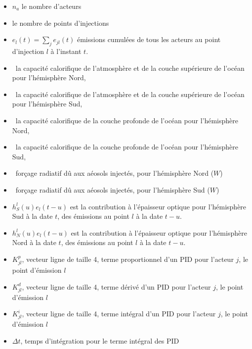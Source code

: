 \documentclass[a4paper,12pt]{article}
\begin{document}
\begin{itemize}
  \item $n_a$ le nombre d'acteurs
  \item \nlat le nombre de points d'injections
  \item $e_{l}(t)=\sum_{j} e_{jl}(t)$ émissions cumulées de tous les acteurs au point d'injection $l$ à l'instant $t$.
  \item \cn \ la capacité calorifique de l'atmosphère et de la couche supérieure de l'océan pour l'hémisphère Nord,
  \item \cs \  la capacité calorifique de l'atmosphère et de la couche supérieure de l'océan pour l'hémisphère Sud, 
  \item \cno\  la capacité calorifique de la couche profonde de l'océan pour l'hémisphère Nord,                     
  \item \cso\  la capacité calorifique de la couche profonde de l'océan pour l'hémisphère Sud,                      
  \item \gn \ forçage radiatif dû aux aéosols injectés, pour l'hémisphère Nord ($W$)
  \item \gs \ forçage radiatif dû aux aéosols injectés, pour l'hémisphère Sud ($W$)
  \item $h_{S}^{l}(u)e_l(t-u)$  est la contribution à l'épaisseur optique pour l'hémisphère Sud 
         à la date  $t$, des émissions au point $l$  à la date $t-u$.
  \item $h_{N}^{l}(u)e_l(t-u)$  est la contribution à l'épaisseur optique pour l'hémisphère Nord
        à la date $t$,  des émissions au point $l$  à la date $t-u$.
       \item $K_{jl}^p$, vecteur ligne de taille 4, terme proportionnel d'un PID pour l'acteur $j$,
             le point d'émission $l$  
       \item $K_{jl}^d$, vecteur ligne de taille 4, terme dérivé d'un PID pour l'acteur $j$,
             le point d'émission $l$  
       \item $K_{jl}^i$, vecteur ligne de taille 4, terme intégral d'un PID pour l'acteur $j$,
             le point d'émission $l$  
   \item $\Delta t$, temps d'intégration pour le terme intégral des PID
\end{itemize}
\end{document}
